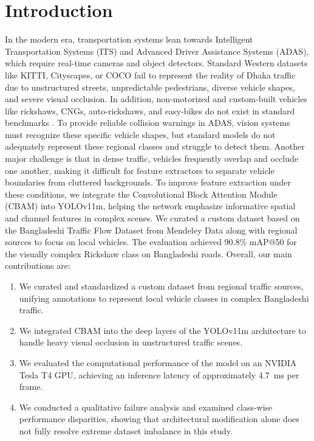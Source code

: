 \documentclass[sigconf]{acmart}
\begin{document}

\maketitle
\section{Introduction}
In the modern era, transportation systems lean towards Intelligent Transportation Systems (ITS) and Advanced Driver Assistance Systems (ADAS), which require real-time cameras and object detectors. Standard Western datasets like KITTI\cite{1a}, Cityscapes\cite{2a}, or COCO\cite{3a} fail to represent the reality of Dhaka traffic due to unstructured streets, unpredictable pedestrians, diverse vehicle shapes, and severe visual occlusion. In addition, non-motorized and custom-built vehicles like rickshaws, CNGs, auto-rickshaws, and easy-bikes do not exist in standard benchmarks \cite{Hasan2021VehicleClassification}. To provide reliable collision warnings in ADAS, vision systems must recognize these specific vehicle shapes, but standard models do not adequately represent these regional classes and struggle to detect them. Another major challenge is that in dense traffic, vehicles frequently overlap and occlude one another, making it difficult for feature extractors to separate vehicle boundaries from cluttered backgrounds. To improve feature extraction under these conditions, we integrate the Convolutional Block Attention Module (CBAM)\cite{Woo2018CBAM} into YOLOv11m, helping the network emphasize informative spatial and channel features in complex scenes. We curated a custom dataset based on the Bangladeshi Traffic Flow Dataset from Mendeley Data\cite{Islam2025BangladeshiTrafficFlow} along with regional sources to focus on local vehicles. The evaluation achieved 90.8\% mAP@50 for the visually complex Rickshaw class on Bangladeshi roads.
Overall, our main contributions are:
\begin{enumerate}
    \item We curated and standardized a custom dataset from regional traffic sources, unifying annotations to represent local vehicle classes in complex Bangladeshi traffic.
    \item We integrated CBAM into the deep layers of the YOLOv11m architecture to handle heavy visual occlusion in unstructured traffic scenes.
    \item We evaluated the computational performance of the model on an NVIDIA Tesla T4 GPU, achieving an inference latency of approximately 4.7~ms per frame.
    \item We conducted a qualitative failure analysis and examined class-wise performance disparities, showing that architectural modification alone does not fully resolve extreme dataset imbalance in this study.
\end{enumerate}
\end{document}

